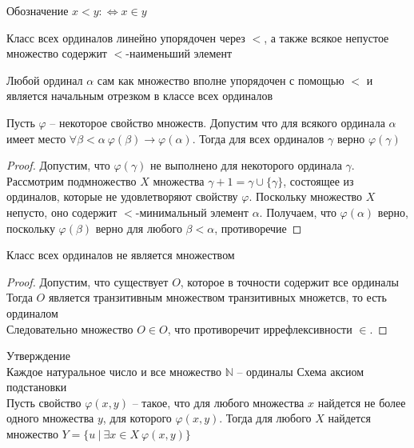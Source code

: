 Обозначение $x < y :\Leftrightarrow x \in y$

\begin{theo}
Класс всех ординалов линейно упорядочен через $<$, а также всякое непустое множество содержит $<$-наименьший элемент
\end{theo}

\begin{corol}
Любой ординал $\alpha$ сам как множество вполне упорядочен с помощью $<$ и является начальным отрезком в классе всех ординалов
\end{corol}

\begin{theo}
Пусть $\varphi$ -- некоторое свойство множеств. Допустим что для всякого ординала $\alpha$ имеет место $\forall \beta < \alpha\ \varphi(\beta) \to \varphi(\alpha)$. Тогда для всех ординалов $\gamma$ верно $\varphi(\gamma)$
\end{theo}
\begin{proof}
Допустим, что $\varphi(\gamma)$ не выполнено для некоторого ординала $\gamma$. Рассмотрим подмножество $X$ множества $\gamma + 1 = \gamma \cup \{\gamma\}$, состоящее из ординалов, которые не удовлетворяют свойству $\varphi$. Поскольку множество $X$ непусто, оно содержит $<$-минимальный элемент $\alpha$. Получаем, что $\varphi(\alpha)$ верно, поскольку $\varphi(\beta)$ верно для любого $\beta < \alpha$, противоречие
\end{proof}

\begin{theo}
Класс всех ординалов не является множеством
\end{theo}
\begin{proof}
Допустим, что существует $O$, которое в точности содержит все ординалы\\
Тогда $O$ является транзитивным множеством транзитивных множетсв, то есть ординалом\\
Следовательно множество $O \in O$, что противоречит иррефлексивности $\in$.
\end{proof}

Утверждение\\
Каждое натуральное число и все множество $\mathbb{N}$ -- ординалы
\vskip 0.2in
Схема аксиом подстановки\\
Пусть свойство $\varphi(x,y)$ -- такое, что для любого множества $x$ найдется не более одного множества $y$, для которого $\varphi(x,y)$. Тогда для любого $X$ найдется множество $Y = \{u\ |\ \exists x \in X\ \varphi(x,y)\}$
\vskip 0.1in


